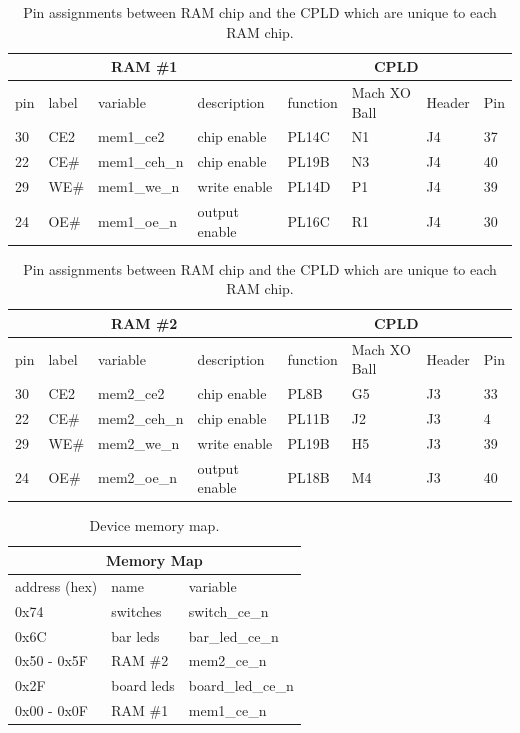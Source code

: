 \documentclass{article}
\begin{document}
\begin{table}
\center

\begin{tabular}{|l|l|l|l|l|l|l|l|}
    \hline
	\multicolumn{4}{|c|}{\textbf{RAM \#1}} & \multicolumn{4}{|c|}{\textbf{CPLD}} \\
	\hline
    pin & label & variable & description &  function & Mach XO Ball & Header & Pin \\
    \hline
    30 & CE2 & mem1\_ce2 & chip enable & PL14C & N1 & J4 & 37 \\
	\hline
    22 & CE\# & mem1\_ceh\_n & chip enable & PL19B & N3 & J4 & 40 \\
	\hline
    29 & WE\# & mem1\_we\_n & write enable & PL14D & P1 & J4 & 39 \\
	\hline
    24 & OE\# & mem1\_oe\_n & output enable & PL16C & R1 & J4 & 30 \\
	\hline
\end{tabular}

\vspace{5mm}  

\begin{tabular}{|l|l|l|l|l|l|l|l|}
    \hline
	\multicolumn{4}{|c|}{\textbf{RAM \#2}} & \multicolumn{4}{|c|}{\textbf{CPLD}} \\
	\hline
    pin & label & variable & description &  function & Mach XO Ball & Header & Pin \\
    \hline
    30 & CE2 & mem2\_ce2 & chip enable & PL8B & G5 & J3 & 33 \\
	\hline
    22 & CE\# & mem2\_ceh\_n & chip enable & PL11B & J2 & J3 & 4 \\
	\hline
    29 & WE\# & mem2\_we\_n & write enable & PL19B & H5 & J3 & 39 \\
	\hline
    24 & OE\# & mem2\_oe\_n & output enable & PL18B & M4 & J3 & 40 \\
	\hline
\end{tabular}

\caption{Pin assignments between RAM chip and the CPLD
which are unique to each RAM chip.}
\label{tbl:rampinsuniq}
\end{table}


\begin{table}
\center
\begin{tabular}{|l|l|l|}
    \hline
    \multicolumn{3}{|c|}{\textbf{Memory Map}} \\
    \hline
    address (hex) & name & variable \\
    \hline
    0x74 & switches & switch\_ce\_n \\
    0x6C & bar leds & bar\_led\_ce\_n \\
    0x50 - 0x5F & RAM \#2 & mem2\_ce\_n \\
    0x2F & board leds & board\_led\_ce\_n \\
    0x00 - 0x0F & RAM \#1 & mem1\_ce\_n \\
    \hline
\end{tabular}
\caption{Device memory map.}
\label{tbl:memmap}
\end{table}
\end{document}

